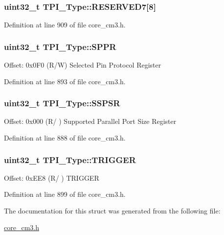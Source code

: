 \subsubsection[{\texorpdfstring{R\+E\+S\+E\+R\+V\+E\+D7}{RESERVED7}}]{\setlength{\rightskip}{0pt plus 5cm}uint32\+\_\+t T\+P\+I\+\_\+\+Type\+::\+R\+E\+S\+E\+R\+V\+E\+D7\mbox{[}8\mbox{]}}\hypertarget{structTPI__Type_a476ca23fbc9480f1697fbec871130550}{}\label{structTPI__Type_a476ca23fbc9480f1697fbec871130550}


Definition at line 909 of file core\+\_\+cm3.\+h.

\subsubsection[{\texorpdfstring{S\+P\+PR}{SPPR}}]{ uint32\+\_\+t T\+P\+I\+\_\+\+Type\+::\+S\+P\+PR}\hypertarget{structTPI__Type_a3eb655f2e45d7af358775025c1a50c8e}{}\label{structTPI__Type_a3eb655f2e45d7af358775025c1a50c8e}
Offset\+: 0x0\+F0 (R/W) Selected Pin Protocol Register 

Definition at line 893 of file core\+\_\+cm3.\+h.

\subsubsection[{\texorpdfstring{S\+S\+P\+SR}{SSPSR}}]{ uint32\+\_\+t T\+P\+I\+\_\+\+Type\+::\+S\+S\+P\+SR}\hypertarget{structTPI__Type_a158e9d784f6ee6398f4bdcb2e4ca0912}{}\label{structTPI__Type_a158e9d784f6ee6398f4bdcb2e4ca0912}
Offset\+: 0x000 (R/ ) Supported Parallel Port Size Register 

Definition at line 888 of file core\+\_\+cm3.\+h.

\subsubsection[{\texorpdfstring{T\+R\+I\+G\+G\+ER}{TRIGGER}}]{ uint32\+\_\+t T\+P\+I\+\_\+\+Type\+::\+T\+R\+I\+G\+G\+ER}\hypertarget{structTPI__Type_aa4b603c71768dbda553da571eccba1fe}{}\label{structTPI__Type_aa4b603c71768dbda553da571eccba1fe}
Offset\+: 0x\+E\+E8 (R/ ) T\+R\+I\+G\+G\+ER 

Definition at line 899 of file core\+\_\+cm3.\+h.



The documentation for this struct was generated from the following file\+:\begin{DoxyCompactItemize}
\item 
\hyperlink{core__cm3_8h}{core\+\_\+cm3.\+h}\end{DoxyCompactItemize}
